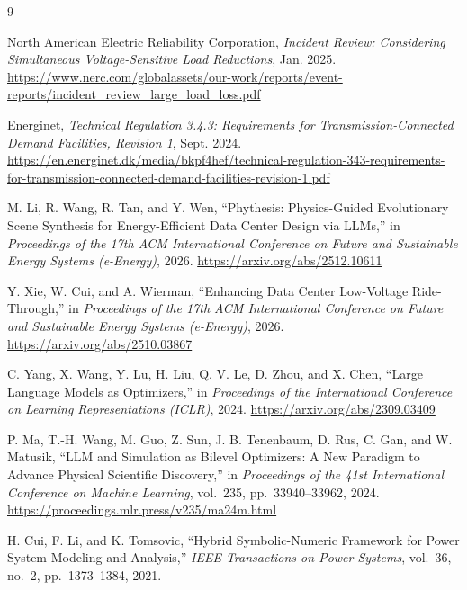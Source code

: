 \documentclass[11pt,a4paper]{article}
\begin{document}
\begin{thebibliography}{9}

    North American Electric Reliability Corporation,
    \emph{Incident Review: Considering Simultaneous Voltage-Sensitive Load Reductions},
    Jan. 2025.
    \url{https://www.nerc.com/globalassets/our-work/reports/event-reports/incident_review_large_load_loss.pdf}

    Energinet,
    \emph{Technical Regulation 3.4.3: Requirements for Transmission-Connected Demand Facilities, Revision 1},
    Sept. 2024.
    \url{https://en.energinet.dk/media/bkpf4hef/technical-regulation-343-requirements-for-transmission-connected-demand-facilities-revision-1.pdf}

    M. Li, R. Wang, R. Tan, and Y. Wen,
    ``Phythesis: Physics-Guided Evolutionary Scene Synthesis for Energy-Efficient Data Center Design via LLMs,''
    in \emph{Proceedings of the 17th ACM International Conference on Future and Sustainable Energy Systems (e-Energy)}, 2026.
    \url{https://arxiv.org/abs/2512.10611}

    Y. Xie, W. Cui, and A. Wierman,
    ``Enhancing Data Center Low-Voltage Ride-Through,''
    in \emph{Proceedings of the 17th ACM International Conference on Future and Sustainable Energy Systems (e-Energy)}, 2026.
    \url{https://arxiv.org/abs/2510.03867}

    C. Yang, X. Wang, Y. Lu, H. Liu, Q. V. Le, D. Zhou, and X. Chen,
    ``Large Language Models as Optimizers,''
    in \emph{Proceedings of the International Conference on Learning Representations (ICLR)}, 2024.
    \url{https://arxiv.org/abs/2309.03409}

    P. Ma, T.-H. Wang, M. Guo, Z. Sun, J. B. Tenenbaum, D. Rus, C. Gan, and W. Matusik,
    ``LLM and Simulation as Bilevel Optimizers: A New Paradigm to Advance Physical Scientific Discovery,''
    in \emph{Proceedings of the 41st International Conference on Machine Learning},
    vol.~235, pp.~33940--33962, 2024.
    \url{https://proceedings.mlr.press/v235/ma24m.html}

    H. Cui, F. Li, and K. Tomsovic,
    ``Hybrid Symbolic-Numeric Framework for Power System Modeling and Analysis,''
    \emph{IEEE Transactions on Power Systems}, vol.~36, no.~2, pp.~1373--1384, 2021.

\end{thebibliography}
\end{document}
